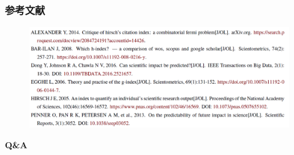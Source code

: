 \documentclass[11pt,compress,t, xcolor=table]{beamer}
\begin{document}
	




\begin{frame}[plain]
	\frametitle{参考文献}
	\begin{figure}[H]
		\centering
		\includegraphics[width=11.5cm]{image/ref.png}
	\end{figure}
\end{frame}


\begin{frame}[plain]
\vspace{0.4\textheight}
\begin{center}
	\Huge\bfseries\textcolor{TsinghuaPurple}{Q\&A}
\end{center}
\end{frame}
\end{document}
